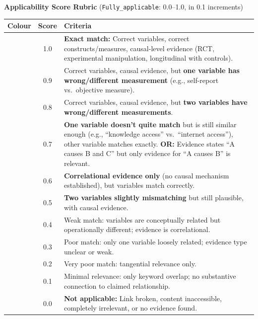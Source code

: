 \begin{table}[H]
\vspace{1em}

\textbf{Applicability Score Rubric} (\texttt{Fully\_applicable}: 0.0--1.0, in 0.1 increments)

\vspace{0.5em}

\begin{tabular}{|c|c|p{9cm}|}
\hline
\textbf{Colour} & \textbf{Score} & \textbf{Criteria} \\
\hline
\cellcolor{green!70!black}\textcolor{white}{} & 1.0 & \textbf{Exact match:} Correct variables, correct constructs/measures, causal-level evidence (RCT, experimental manipulation, longitudinal with controls). \\
\hline
\cellcolor{green!60} & 0.9 & Correct variables, causal evidence, but \textbf{one variable has wrong/different measurement} (e.g., self-report vs.\ objective measure). \\
\hline
\cellcolor{green!50} & 0.8 & Correct variables, causal evidence, but \textbf{two variables have wrong/different measurements}. \\
\hline
\cellcolor{yellow!70} & 0.7 & \textbf{One variable doesn't quite match} but is still similar enough (e.g., ``knowledge access'' vs.\ ``internet access''), other variable matches exactly. \textbf{OR:} Evidence states ``A causes B and C'' but only evidence for ``A causes B'' is relevant. \\
\hline
\cellcolor{yellow!50} & 0.6 & \textbf{Correlational evidence only} (no causal mechanism established), but variables match correctly. \\
\hline
\cellcolor{orange!50} & 0.5 & \textbf{Two variables slightly mismatching} but still plausible, with causal evidence. \\
\hline
\cellcolor{orange!70} & 0.4 & Weak match: variables are conceptually related but operationally different; evidence is correlational. \\
\hline
\cellcolor{red!50} & 0.3 & Poor match: only one variable loosely related; evidence type unclear or weak. \\
\hline
\cellcolor{red!70} & 0.2 & Very poor match: tangential relevance only. \\
\hline
\cellcolor{red!90}\textcolor{white}{} & 0.1 & Minimal relevance: only keyword overlap; no substantive connection to claimed relationship. \\
\hline
\cellcolor{gray!70} & 0.0 & \textbf{Not applicable:} Link broken, content inaccessible, completely irrelevant, or no evidence found. \\
\hline
\end{tabular}

\end{table}

